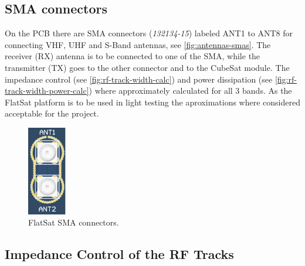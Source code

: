 \subsection{SMA connectors}

On the PCB there are SMA connectors (\textit{132134-15}) labeled ANT1 to ANT8 for connecting VHF, UHF and S-Band antennas, see \autoref{fig:antennas-smas}. The receiver (RX) antenna is to be connected to one of the SMA, while the transmitter (TX) goes to the other connector and to the CubeSat module. The impedance control (see \autoref{fig:rf-track-width-calc}) and power dissipation (see \autoref{fig:rf-track-width-power-calc}) where approximately calculated for all 3 bands. As the FlatSat platform is to be used in light testing the aproximations where considered acceptable for the project.

\begin{figure}[!ht]
    \begin{center}
        \includegraphics[width=0.15\textwidth]{figures/antennas_smas.png}
        \caption{FlatSat SMA connectors.}
        \label{fig:antennas-smas}
    \end{center}
\end{figure}

\subsection{Impedance Control of the RF Tracks}

